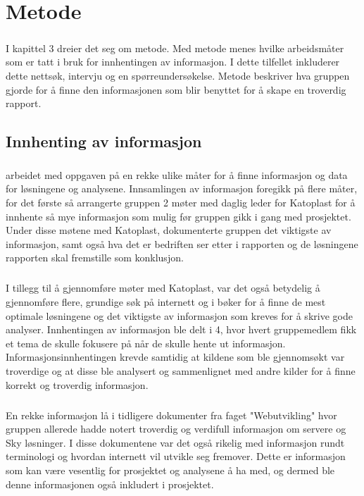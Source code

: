 \chapter{Metode}
\paragraph{}I kapittel 3 dreier det seg om metode. Med metode menes hvilke arbeidsmåter som er tatt i bruk for innhentingen av informasjon. I dette tilfellet inkluderer dette nettsøk, intervju og en spørreundersøkelse. Metode beskriver hva gruppen gjorde for å finne den informasjonen som blir benyttet for å skape en troverdig rapport.
\section{Innhenting av informasjon}
\paragraph{} \gruppen arbeidet med oppgaven på en rekke ulike måter for å finne informasjon og data for løsningene og analysene. Innsamlingen av informasjon foregikk på flere måter, for det første så arrangerte gruppen 2 møter med daglig leder for Katoplast for å innhente så mye informasjon som mulig før gruppen gikk i gang med prosjektet. Under disse møtene med Katoplast, dokumenterte gruppen det viktigste av informasjon, samt også hva det er bedriften ser etter i rapporten og de løsningene rapporten skal fremstille som konklusjon.

\paragraph{} I tillegg til å gjennomføre møter med Katoplast, var det også betydelig å gjennomføre flere, grundige søk på internett og i bøker for å finne de mest optimale løsningene og det viktigste av informasjon som kreves for å skrive gode analyser. Innhentingen av informasjon ble delt i 4, hvor hvert gruppemedlem fikk et tema de skulle fokusere på når de skulle hente ut informasjon. Informasjonsinnhentingen krevde samtidig at kildene som ble gjennomsøkt var troverdige og at disse ble analysert og sammenlignet med andre kilder for å finne korrekt og troverdig informasjon. 

\paragraph{} En rekke informasjon lå i tidligere dokumenter fra faget "Webutvikling" hvor gruppen allerede hadde notert troverdig og verdifull informasjon om servere og Sky løsninger. I disse dokumentene var det også rikelig med informasjon rundt terminologi og hvordan internett vil utvikle seg fremover. Dette er informasjon som kan være vesentlig for prosjektet og analysene å ha med, og dermed ble denne informasjonen også inkludert i prosjektet.

